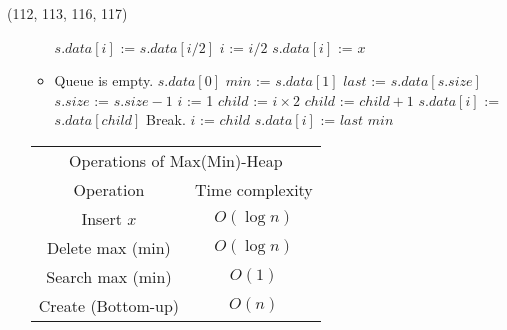\begin{theorem}{(112, 113, 116, 117)}
\begin{itemize}
\begin{itemize}
\begin{algorithm}[H]
\begin{algorithmic}[1]
                            \State $s.data[i]$ := $s.data[i / 2]$
                            \State $i$ := $i / 2$
                        \EndWhile
                        \State $s.data[i]$ := $x$
                    \EndFunction
                \end{algorithmic}
            \end{algorithm} 
            \item \begin{algorithm}[H]
                \begin{algorithmic}[1]
                            \State Queue is empty.
                            \State \Return $s.data[0]$
                        \EndIf
                        \State $min$ := $s.data[1]$
                        \State $last$ := $s.data[s.size]$
                        \State $s.size$ := $s.size - 1$
                        \State $i$ := 1
                            \State $child$ := $i \times 2$
                             
                                \State $child$ := $child + 1$
                            \EndIf
                             
                                \State $s.data[i]$ := $s.data[child]$
                            \Else
                                \State Break.
                            \EndIf
                            \State $i$ := $child$
                        \EndWhile
                        \State $s.data[i]$ := $last$
                        \State \Return $min$
                    \EndFunction
                \end{algorithmic}
            \end{algorithm} 
        \end{itemize}
        \begin{table}[H]
            \centering
            \begin{tabular}{|c|c|}
                \hline
                \multicolumn{2}{|c|}{Operations of Max(Min)-Heap} \\
                \Xhline{3\arrayrulewidth}
                Operation & Time complexity \\
                \Xhline{2\arrayrulewidth}
                Insert $x$ & $O(\log n)$ \\
                \hline
                Delete max (min) & $O(\log n)$ \\
                \hline
                Search max (min) & $O(1)$ \\
                \hline
                Create (Bottom-up) & $O(n)$ \\
                \hline
            \end{tabular}
        \end{table}
    \end{itemize}
\end{theorem}

